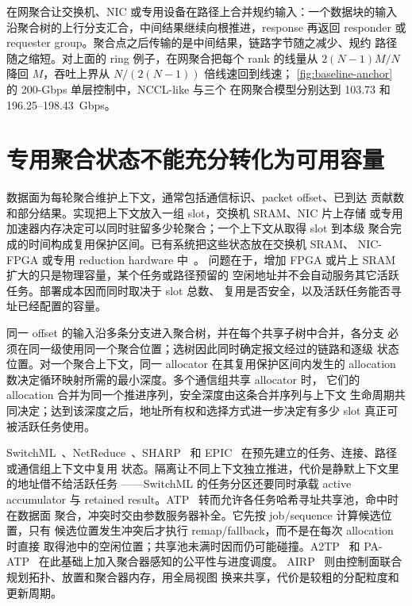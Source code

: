在网聚合让交换机、NIC 或专用设备在路径上合并规约输入：一个数据块的输入
沿聚合树的上行分支汇合，中间结果继续向根推进，response 再返回 responder
或 requester group。聚合点之后传输的是中间结果，链路字节随之减少、规约
路径随之缩短。对上面的 ring 例子，在网聚合把每个 rank 的线量从
$2(N-1)M/N$ 降回 $M$，吞吐上界从 $N/(2(N-1))$ 倍线速回到线速；
\cref{fig:baseline-anchor} 的 200-Gbps 单层控制中，NCCL-like 与三个
在网聚合模型分别达到 103.73 和 196.25--198.43~Gbps。

\section{专用聚合状态不能充分转化为可用容量}
\label{ssec:inc-survey}

数据面为每轮聚合维护上下文，通常包括通信标识、packet offset、已到达
贡献数和部分结果。实现把上下文放入一组 slot，交换机 SRAM、NIC 片上存储
或专用加速器内存决定可以同时驻留多少轮聚合；一个上下文从取得 slot 到本级
聚合完成的时间构成复用保护区间。已有系统把这些状态放在交换机 SRAM、
NIC-FPGA 或专用 reduction hardware 中~\cite{switchml,atp,netreduce,sharp,epic}。
问题在于，增加 FPGA 或片上 SRAM 扩大的只是物理容量，某个任务或路径预留的
空闲地址并不会自动服务其它活跃任务。部署成本因而同时取决于 slot 总数、
复用是否安全，以及活跃任务能否寻址已经配置的容量。

同一 offset 的输入沿多条分支进入聚合树，并在每个共享子树中合并，各分支
必须在同一级使用同一个聚合位置；选树因此同时确定报文经过的链路和逐级
状态位置。对一个聚合上下文，同一 allocator 在其复用保护区间内发生的
allocation 数决定循环映射所需的最小深度。多个通信组共享 allocator 时，
它们的 allocation 合并为同一个推进序列，安全深度由这条合并序列与上下文
生命周期共同决定；达到该深度之后，地址所有权和选择方式进一步决定有多少
slot 真正可被活跃任务使用。

SwitchML~\cite{switchml}、NetReduce~\cite{netreduce}、SHARP~\cite{sharp}
和 EPIC~\cite{epic} 在预先建立的任务、连接、路径或通信组上下文中复用
状态。隔离让不同上下文独立推进，代价是静默上下文里的地址借不给活跃任务
——SwitchML 的任务分区还要同时承载 active accumulator 与 retained
result。ATP~\cite{atp} 转而允许各任务哈希寻址共享池，命中时在数据面
聚合，冲突时交由参数服务器补全。它先按 job/sequence 计算候选位置，只有
候选位置发生冲突后才执行 remap/fallback，而不是在每次 allocation 时直接
取得池中的空闲位置；共享池未满时因而仍可能碰撞。A2TP~\cite{a2tp} 和
PA-ATP~\cite{paatp} 在此基础上加入聚合器感知的公平性与进度调度。
AIRP~\cite{airp} 则由控制面联合规划拓扑、放置和聚合器内存，用全局视图
换来共享，代价是较粗的分配粒度和更新周期。

